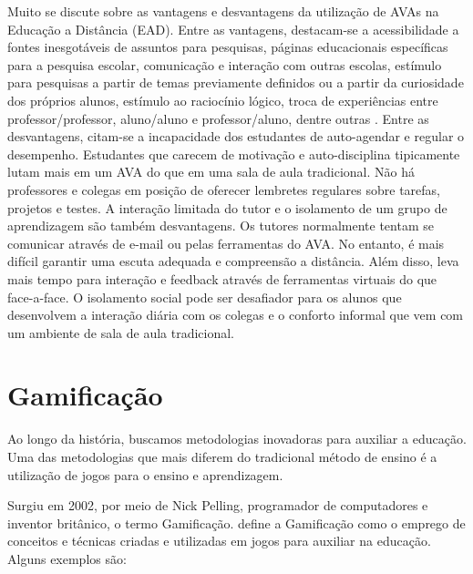 Muito se discute sobre as vantagens e desvantagens da utiliza\c{c}\~ao de AVAs na Educa\c{c}\~ao a Dist\^ancia (EAD). Entre as vantagens, 
destacam-se a acessibilidade a fontes inesgotáveis de assuntos para pesquisas, páginas educacionais específicas para a pesquisa escolar, 
comunicação e interação com outras escolas, estímulo para pesquisas a partir de temas previamente definidos ou a partir da curiosidade dos 
próprios alunos, estímulo ao raciocínio lógico, troca de experiências entre professor/professor, aluno/aluno e professor/aluno, dentre 
outras . Entre as desvantagens, citam-se a incapacidade dos estudantes de auto-agendar e regular o 
desempenho. Estudantes que carecem de motivação e auto-disciplina tipicamente lutam mais em um AVA do que em uma sala de aula 
tradicional. Não há professores e colegas em posição de oferecer lembretes regulares sobre tarefas, projetos e testes. A interação limitada 
do tutor e o isolamento de um grupo de aprendizagem são também desvantagens. Os tutores normalmente tentam se comunicar através de e-mail 
ou pelas ferramentas do AVA. No entanto, é mais difícil garantir uma escuta adequada e compreensão a distância. Além disso, leva mais tempo 
para interação e feedback através de ferramentas virtuais do que face-a-face. O isolamento social pode ser desafiador 
para os alunos que desenvolvem a interação diária com os colegas e o conforto informal que vem com um ambiente de sala de aula tradicional.

\section{Gamificação}

Ao longo da história, buscamos metodologias inovadoras para auxiliar a educação. Uma das metodologias que mais diferem do tradicional método de ensino é a utilização de jogos para o ensino e aprendizagem. 

Surgiu em 2002, por meio de Nick Pelling, programador de computadores e inventor britânico, o termo Gamificação.  define a Gamificação como o emprego de conceitos e 
técnicas criadas e utilizadas em jogos para auxiliar na educação. Alguns exemplos s\~ao:


